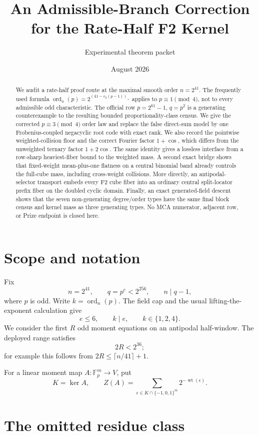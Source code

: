 \documentclass[11pt,a4paper]{amsart}
\title{An Admissible-Branch Correction for the Rate-Half F2 Kernel}
\author{Experimental theorem packet}
\date{August 2026}
\theoremstyle{remark}
\newcommand{\F}{\mathbb F}
\newcommand{\wt}{\operatorname{wt}}
\newcommand{\ord}{\operatorname{ord}}
\begin{document}
\begin{abstract}
We audit a rate-half proof route at the maximal smooth order $n=2^{41}$.
The frequently used formula
\(\ord_n(p)=2^{(41-v_2(p-1))_+}\) applies to
$p\equiv1\pmod4$, not to every admissible odd characteristic.  The official
row $p=2^{61}-1$, $q=p^2$ is a generating counterexample to the resulting
bounded proportionality-class census.  We give the corrected
$p\equiv3\pmod4$ order law and replace the false direct-sum model by one
Frobenius-coupled negacyclic root code with exact rank.  We also record the
pointwise weighted-collision floor and the correct Fourier factor
$1+\cos$, which differs from the unweighted ternary factor $1+2\cos$.
The same identity gives a lossless interface from a row-sharp heaviest-fiber
bound to the weighted mass.  A second exact bridge shows that fixed-weight
mean-plus-one flatness on a central binomial band already controls the
full-cube mass, including cross-weight collisions.  More directly, an
antipodal-selector transport embeds every F2 cube fiber into an ordinary
central split-locator prefix fiber on the doubled cyclic domain.  Finally,
an exact generated-field descent shows that the seven non-generating
degree/order types have the same final block census and kernel mass as
three generating types.
No MCA numerator, adjacent row, or Prize endpoint is closed here.
\end{abstract}
\maketitle

\section{Scope and notation}

Fix
\[
 n=2^{41},\qquad q=p^e<2^{256},\qquad n\mid q-1,
\]
where $p$ is odd.  Write $k=\ord_n(p)$.  The field cap and the usual
lifting-the-exponent calculation give
\[
 e\le 6,\qquad k\mid e,\qquad k\in\{1,2,4\}.
\]
We consider the first $R$ odd moment equations on an antipodal half-window.
The deployed range satisfies
\[
 2R<2^{36};
\]
for example this follows from $2R\le \lceil n/41\rceil+1$.

For a linear moment map $A:\F_p^m\to V$, put
\[
 K=\ker A,
 \qquad
 Z(A)=\sum_{\epsilon\in K\cap\{-1,0,1\}^m}2^{-\wt(\epsilon)}.
\]

\section{The omitted residue class}
\end{document}
